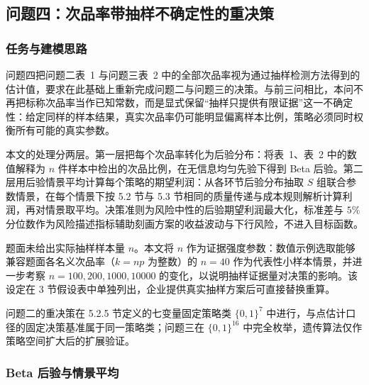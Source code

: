 \subsection{问题四：次品率带抽样不确定性的重决策}

\subsubsection{任务与建模思路}

问题四把问题二表~1 与问题三表~2 中的全部次品率视为通过抽样检测方法得到的估计值，要求在此基础上重新完成问题二与问题三的决策。与前三问相比，本问不再把标称次品率当作已知常数，而是显式保留“抽样只提供有限证据”这一不确定性：给定同样的样本结果，真实次品率仍可能明显偏离样本比例，策略必须同时权衡所有可能的真实参数。

本文的处理分两层。第一层把每个次品率转化为后验分布：将表~1、表~2 中的数值解释为 $n$ 件样本中检出的次品比例，在无信息均匀先验下得到 Beta 后验。第二层用后验情景平均计算每个策略的期望利润：从各环节后验分布抽取 $S$ 组联合参数情景，在每个情景下按 5.2 节与 5.3 节相同的质量传递与成本规则解析计算利润，再对情景取平均。决策准则为风险中性的后验期望利润最大化，标准差与 $5\%$ 分位数作为风险描述指标辅助刻画方案的收益波动与下行风险，不进入目标函数。

题面未给出实际抽样样本量 $n$。本文将 $n$ 作为证据强度参数：数值示例选取能够兼容题面各名义次品率（$k=np$ 为整数）的 $n=40$ 作为代表性小样本情景，并进一步考察 $n=100,200,1000,10000$ 的变化，以说明抽样证据量对决策的影响。该设定在 3 节假设表中单独列出，企业提供真实抽样方案后可直接替换重算。

问题二的重决策在 5.2.5 节定义的七变量固定策略类 $\{0,1\}^7$ 中进行，与点估计口径的固定决策基准属于同一策略类；问题三在 $\{0,1\}^{16}$ 中完全枚举，遗传算法仅作策略空间扩大后的扩展验证。

\subsubsection{Beta 后验与情景平均}

